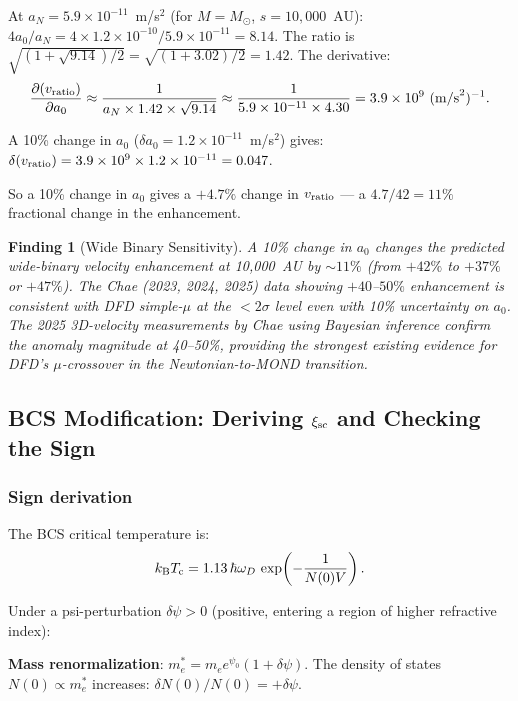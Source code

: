 \documentclass[11pt]{article}
\newtheorem{finding}{Finding}[section]
\theoremstyle{definition}
\theoremstyle{remark}
\newcommand{\ee}[1]{\times 10^{#1}}
\newcommand{\Tc}{T_{\rm c}}
\begin{document}
At $a_N = 5.9\ee{-11}$~m/s$^2$ (for $M = M_\odot$, $s = 10{,}000$~AU):
$4a_0/a_N = 4 \times 1.2\ee{-10}/5.9\ee{-11} = 8.14$.
The ratio is $\sqrt{(1+\sqrt{9.14})/2} = \sqrt{(1+3.02)/2} = 1.42$.
The derivative:
\begin{equation}
\frac{\partial(v_{\rm ratio})}{\partial a_0} \approx
\frac{1}{a_N\times 1.42\times\sqrt{9.14}} \approx
\frac{1}{5.9\ee{-11}\times 4.30} = 3.9\ee{9}~({\rm m/s}^2)^{-1}.
\end{equation}

A 10\% change in $a_0$ ($\delta a_0 = 1.2\ee{-11}$~m/s$^2$) gives:
$\delta(v_{\rm ratio}) = 3.9\ee{9} \times 1.2\ee{-11} = 0.047$.

So a 10\% change in $a_0$ gives a $+4.7\%$ change in $v_{\rm ratio}$
--- a $4.7/42 = 11\%$ fractional change in the enhancement.

\begin{finding}[Wide Binary Sensitivity]
A 10\% change in $a_0$ changes the predicted wide-binary velocity enhancement
at 10,000~AU by $\sim 11\%$ (from $+42\%$ to $+37\%$ or $+47\%$). The Chae
(2023, 2024, 2025) data showing $+40$--$50\%$ enhancement is consistent with
DFD simple-$\mu$ at the $< 2\sigma$ level even with 10\% uncertainty on
$a_0$. The 2025 3D-velocity measurements by Chae using Bayesian inference
confirm the anomaly magnitude at 40--50\%, providing the strongest existing
evidence for DFD's $\mu$-crossover in the Newtonian-to-MOND transition.
\end{finding}

\subsection{BCS Modification: Deriving $\xi_{\rm sc}$ and Checking the Sign}
\label{sec:bcs-derivation}

\subsubsection{Sign derivation}

The BCS critical temperature is:
\begin{equation}
k_{\rm B}\Tc = 1.13\,\hbar\omega_D\,\exp\!\left(-\frac{1}{N(0)V}\right).
\end{equation}

Under a psi-perturbation $\delta\psi > 0$ (positive, entering a region of
higher refractive index):

\textbf{Mass renormalization}: $m_e^* = m_e e^{\psi_0}(1+\delta\psi)$.
The density of states $N(0) \propto m_e^*$ increases:
$\delta N(0)/N(0) = +\delta\psi$.
\end{document}

